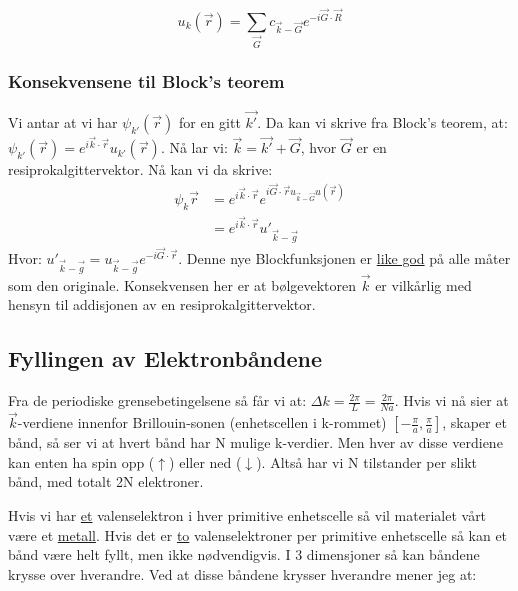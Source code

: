 \documentclass{article}
\begin{document}
\begin{equation*}
  u_k(\vec{r}) = \sum_{\vec{G}} c_{\vec{k} - \vec{G}} e^{-i \vec{G} \cdot \vec{R}}
\end{equation*}
\subsubsection{Konsekvensene til Block's teorem}
Vi antar at vi har $\psi_{k'}(\vec{r})$ for en gitt $\vec{k'}$. Da kan vi skrive fra Block's teorem, at: $\psi_{k'}(\vec{r}) = e^{i\vec{k}\cdot\vec{r}} u_{k'}(\vec{r})$. Nå lar vi: $\vec{k} = \vec{k'} + \vec{G}$, hvor $\vec{G}$ er en resiprokalgittervektor. Nå kan vi da skrive:
\begin{align*}
  \psi_k{\vec{r}} &= e^{i \vec{k} \cdot \vec{r}} e^{i \vec{G} \cdot \vec{r} u_{\vec{k} - \vec{G}}u(\vec{r})} \\
  &= e^{i\vec{k}\cdot\vec{r}}{u'}_{\vec{k}-\vec{g}}
\end{align*}
Hvor: ${u'}_{\vec{k}-\vec{g}} = {u}_{\vec{k}-\vec{g}} e^{-i \vec{G}\cdot \vec{r}}$.
Denne nye Blockfunksjonen er \underline{like god} på alle måter som den originale. Konsekvensen her er at bølgevektoren $\vec{k}$ er vilkårlig med hensyn til addisjonen av en resiprokalgittervektor.

\subsection{Fyllingen av Elektronbåndene}
Fra de periodiske grensebetingelsene så får vi at: $\Delta k = \frac{2\pi}{L} = \frac{2\pi}{Na}$. Hvis vi nå sier at $\vec{k}$-verdiene innenfor  Brillouin-sonen (enhetscellen i k-rommet) $\left[-\frac{\pi}{a}, \frac{\pi}{a} \right]$, skaper et bånd, så ser vi at hvert bånd har N mulige k-verdier. Men hver av disse verdiene kan enten ha spin opp ($\uparrow$) eller ned ($\downarrow$). Altså har vi N tilstander per slikt bånd, med totalt 2N elektroner.

Hvis vi har \underline{et} valenselektron i hver primitive enhetscelle så vil materialet vårt være et \underline{metall}. Hvis det er \underline{to} valenselektroner per primitive enhetscelle så kan et bånd være helt fyllt, men ikke nødvendigvis. I 3 dimensjoner så kan båndene krysse over hverandre. Ved at disse båndene krysser hverandre mener jeg at: %
\end{document}
